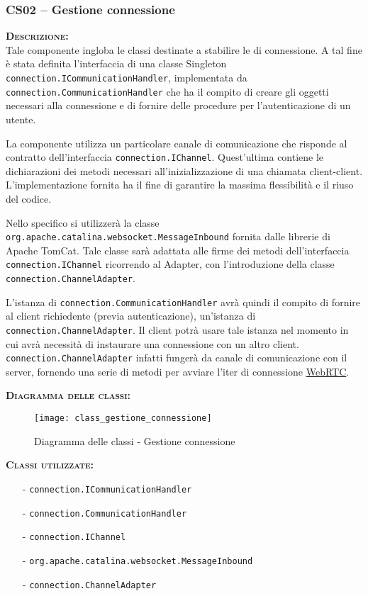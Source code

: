 \subsubsection{CS02 -- Gestione connessione}\label{sec:gestioneconnessione}
\begin{description}
	\item{\scshape\bfseries Descrizione:}\\
Tale componente ingloba le classi destinate a stabilire le  di connessione. A tal fine è stata definita l'interfaccia di una classe Singleton \texttt{connection.ICommunicationHandler}, implementata da \texttt{connection.CommunicationHandler} che ha il compito di creare gli oggetti necessari alla connessione e di fornire delle procedure per l'autenticazione di un utente.

La componente utilizza un particolare canale di comunicazione che risponde al contratto dell'interfaccia \texttt{connection.IChannel}. Quest'ultima contiene le dichiarazioni dei metodi necessari all'inizializzazione di una chiamata client-client. L'implementazione fornita ha il fine di garantire la massima flessibilità e il riuso del codice.

Nello specifico si utilizzerà la classe \texttt{org.apache.catalina.websocket.MessageInbound} fornita dalle librerie di Apache TomCat. Tale classe sarà adattata alle firme dei metodi dell'interfaccia \texttt{connection.IChannel} ricorrendo al  Adapter, con l'introduzione della classe \texttt{connection.ChannelAdapter}. 

L'istanza di \texttt{connection.CommunicationHandler} avrà quindi il compito di fornire al client richiedente (previa autenticazione), un'istanza di \texttt{connection.ChannelAdapter}. Il client potrà usare tale istanza nel momento in cui avrà necessità di instaurare una connessione con un altro client. \texttt{connection.ChannelAdapter} infatti fungerà da canale di comunicazione con il server, fornendo una serie di metodi per avviare l'iter di connessione \underline{WebRTC}\@.

	\item{\scshape\bfseries Diagramma delle classi:}
\begin{figure}[H]
  \centering
  \texttt{[image: class\_gestione\_connessione]}
  \caption{Diagramma delle classi - Gestione connessione}\label{fig:gestioneconnessione}
\end{figure}
	
	\item{\scshape\bfseries Classi utilizzate:}
	\begin{itemize}[nolistsep, noitemsep]
	  \item[-] \texttt{connection.ICommunicationHandler}
	  \item[-] \texttt{connection.CommunicationHandler}
	  \item[-] \texttt{connection.IChannel}
	  \item[-] \texttt{org.apache.catalina.websocket.MessageInbound}
	  \item[-] \texttt{connection.ChannelAdapter}
	\end{itemize}
\end{description}

